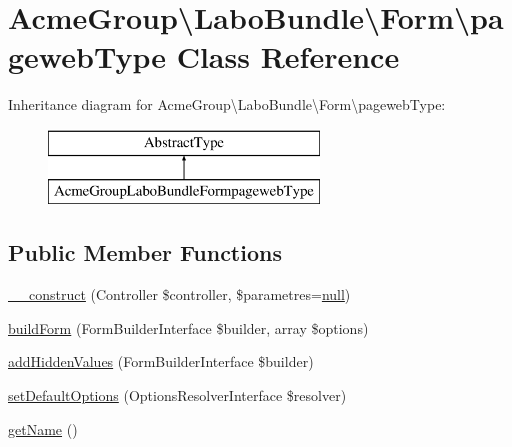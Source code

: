 \hypertarget{class_acme_group_1_1_labo_bundle_1_1_form_1_1pageweb_type}{\section{Acme\+Group\textbackslash{}Labo\+Bundle\textbackslash{}Form\textbackslash{}pageweb\+Type Class Reference}
\label{class_acme_group_1_1_labo_bundle_1_1_form_1_1pageweb_type}
}
Inheritance diagram for Acme\+Group\textbackslash{}Labo\+Bundle\textbackslash{}Form\textbackslash{}pageweb\+Type\+:\begin{figure}[H]
\begin{center}
\leavevmode
\includegraphics[height=2.000000cm]{class_acme_group_1_1_labo_bundle_1_1_form_1_1pageweb_type}
\end{center}
\end{figure}
\subsection*{Public Member Functions}
\begin{DoxyCompactItemize}
\item 
\hyperlink{class_acme_group_1_1_labo_bundle_1_1_form_1_1pageweb_type_ab2b8881d1bad46b50de822661b2dacce}{\+\_\+\+\_\+construct} (Controller \$controller, \$parametres=\hyperlink{validate_8js_afb8e110345c45e74478894341ab6b28e}{null})
\item 
\hyperlink{class_acme_group_1_1_labo_bundle_1_1_form_1_1pageweb_type_a2a19d342914e6a6540d53dfb556264be}{build\+Form} (Form\+Builder\+Interface \$builder, array \$options)
\item 
\hyperlink{class_acme_group_1_1_labo_bundle_1_1_form_1_1pageweb_type_aadec8e9d929fcac8753d4ab665a5cb80}{add\+Hidden\+Values} (Form\+Builder\+Interface \$builder)
\item 
\hyperlink{class_acme_group_1_1_labo_bundle_1_1_form_1_1pageweb_type_a0d500073aa9d7e9f6142bc43588e9cf8}{set\+Default\+Options} (Options\+Resolver\+Interface \$resolver)
\item 
\hyperlink{class_acme_group_1_1_labo_bundle_1_1_form_1_1pageweb_type_a54955fc97db2374d152b87ea59c7c32a}{get\+Name} ()
\end{DoxyCompactItemize}


